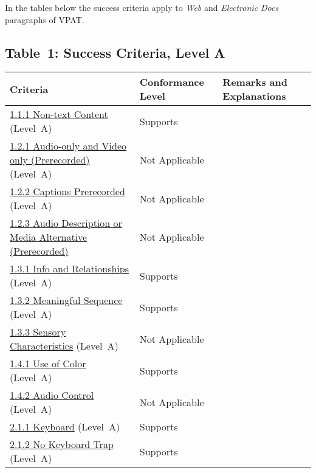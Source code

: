\documentclass{report}
\begin{document}
In the tables below the success criteria apply to \emph{Web} and
\emph{Electronic Docs} paragraphs of VPAT.

\clearpage
\subsection{Table~1:  Success Criteria, Level A}
\label{sec:WCAG-A}
\begin{longtable}{p{}<{\RaggedRight}p{}<{\RaggedRight}p{}<{\RaggedRight}}
  \toprule
  Criteria & Conformance Level & Remarks and Explanations \\
  \midrule
  \endhead
  \bottomrule
  \endfoot
	\href{https://www.w3.org/TR/WCAG20/#text-equiv-all}{1.1.1
  Non-text Content} (Level~A) & Supports \\
        \href{https://www.w3.org/TR/WCAG20/#media-equiv-av-only-alt}{1.2.1
  Audio-only and Video only (Prerecorded)} (Level~A) & Not Applicable\\
  \href{https://www.w3.org/TR/WCAG20/#media-equiv-captions}{1.2.2
  Captions Prerecorded} (Level~A) & Not Applicable\\
        \href{http://www.w3.org/TR/WCAG20/#media-equiv-audio-desc}{1.2.3
                                    Audio Description or Media
                                    Alternative (Prerecorded)}
                               & Not Applicable\\
        \href{http://www.w3.org/TR/WCAG20/#content-structure-separation-programmatic}{1.3.1
  Info and Relationships} (Level~A) & Supports \\
    \href{http://www.w3.org/TR/WCAG20/#content-structure-separation-programmatic}{1.3.2
  Meaningful Sequence} (Level~A) & Supports \\
  \href{http://www.w3.org/TR/WCAG20/#content-structure-separation-understanding}{1.3.3
  Sensory Characteristics} (Level~A) & Not Applicable\\
  \href{http://www.w3.org/TR/WCAG20/#visual-audio-contrast-without-color}{1.4.1
  Use of Color} (Level~A) & Supports \\
  \href{http://www.w3.org/TR/WCAG20/#visual-audio-contrast-dis-audio}{1.4.2
  Audio Control} (Level~A) & Not Applicable\\
  \href{http://www.w3.org/TR/WCAG20/#keyboard-operation-keyboard-operable}{2.1.1
  Keyboard} (Level~A) & Supports \\
  \href{http://www.w3.org/TR/WCAG20/#keyboard-operation-trapping}{2.1.2
  No Keyboard Trap} (Level~A) & Supports \\

\end{longtable}
\end{document}
